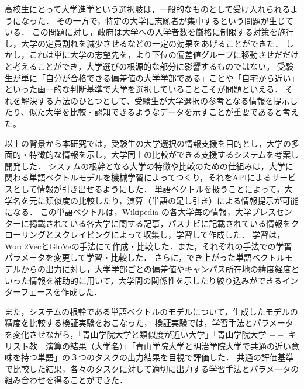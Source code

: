 高校生にとって大学進学という選択肢は，一般的なものとして受け入れられるようになった．
その一方で，特定の大学に志願者が集中するという問題が生じている．
この問題に対し，政府は大学への入学者数を厳格に制限する対策を施行し，大学の定員割れを減少させるなどの一定の効果をあげることができた．
しかし，これは単に大学の志望先を，より下位の偏差値グループに移動させだだけと考えることができ，大学選びの根源的な部分に影響するものではない。
受験生が単に「自分が合格できる偏差値の大学学部である」ことや「自宅から近い」といった画一的な判断基準で大学を選択していることこそが問題といえる．
それを解決する方法のひとつとして、受験生が大学選択の参考となる情報を提示したり、似た大学を比較・認知できるようなデータを示すことが重要であると考えた。

以上の背景から本研究では，受験生の大学選択の情報支援を目的とし，大学の多面的・特徴的な情報を示し，大学同士の比較ができる支援するシステムを考案し開発した．
システムの根幹となる大学の特徴や比較のための仕組みは，大学に関わる単語ベクトルモデルを機械学習によってつくり，それをAPIによるサービスとして情報が引き出せるようにした．
単語ベクトルを扱うことによって，大学名を元に類似度の比較したり，演算（単語の足し引き）による情報提示が可能になる．
この単語ベクトルは，Wikipedia の各大学毎の情報，大学プレスセンターに掲載されている各大学に関する記事，パスナビに記載されている情報をクローリングとスクレイピングによって収集し，学習して作成した．
学習は，Word2VecとGloVeの手法にて作成・比較した．また，それぞれの手法での学習パラメータを変更して学習・比較した．
さらに，でき上がった単語ベクトルモデルからの出力に対し，大学学部ごとの偏差値やキャンパス所在地の緯度経度といった情報を補助的に用いて，大学間の関係性を示したり絞り込みができるインターフェースを作成した．

また，システムの根幹である単語ベクトルのモデルについて，生成したモデルの精度を比較する検証実験をおこなった，
検証実験では，学習手法とパラメータを変化させながら，「青山学院大学と類似度が近い大学」「青山学院大学 $--$ キリスト教　演算の結果（大学名）」「青山学院大学と明治学院大学で共通の近い意味を持つ単語」の３つのタスクの出力結果を目視で評価した．
共通の評価基準で比較した結果，各々のタスクに対して適切に出力する学習手法とパラメータの組み合わせを得ることができた．
